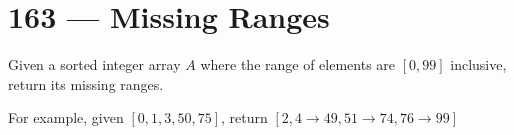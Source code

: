 \section{163 --- Missing Ranges}
Given a sorted integer array $A$ where the range of elements are $[0, 99]$ inclusive, return its missing ranges.

For example, given $[0, 1, 3, 50, 75]$, return $[2, 4\to49, 51\to74, 76\to99]$